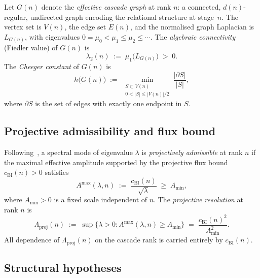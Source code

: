 \documentclass[12pt, a4paper]{article}
\theoremstyle{plain}
\theoremstyle{definition}
\theoremstyle{remark}
\begin{document}
      Let $G(n)$ denote the \emph{effective cascade graph} at rank $n$: a
      connected, $d(n)$-regular, undirected graph encoding the relational structure
      at stage~$n$.
      The vertex set is $V(n)$, the edge set $E(n)$, and the normalised graph
      Laplacian is $L_{G(n)}$, with eigenvalues
      $0 = \mu_0 < \mu_1 \leq \mu_2 \leq \cdots$.
      The \emph{algebraic connectivity} (Fiedler value) of $G(n)$ is
      \begin{equation}
        \label{eq:fiedler}
        \lambda_2(n) \;:=\; \mu_1\bigl(L_{G(n)}\bigr) \;>\; 0.
      \end{equation}
      The \emph{Cheeger constant} of $G(n)$ is
      \begin{equation}
        \label{eq:cheeger-def}
        h\bigl(G(n)\bigr)
        \;:=\;
        \min_{\substack{S \subset V(n) \\ 0 < |S| \leq |V(n)|/2}}
        \frac{|\partial S|}{|S|},
      \end{equation}
      where $\partial S$ is the set of edges with exactly one endpoint in $S$.

    \subsection{Projective admissibility and flux bound}
      \label{sec:framework:admissibility}

      Following~\cite{Beau2026a1, Beau2026a4}, a spectral mode
      of eigenvalue $\lambda$ is \emph{projectively admissible} at rank $n$ if the
      maximal effective amplitude supported by the projective flux bound
      $c_{\mathrm{BI}}(n) > 0$ satisfies
      \begin{equation}
        \label{eq:admissibility-envelope}
        A^{\max}(\lambda, n)
        \;:=\; \frac{c_{\mathrm{BI}}(n)}{\sqrt{\lambda}}
        \;\geq\; A_{\min},
      \end{equation}
      where $A_{\min} > 0$ is a fixed scale independent of $n$.
      The \emph{projective resolution} at rank $n$ is
      \begin{equation}
        \label{eq:Lambdaproj-def}
        \Lambda_{\mathrm{proj}}(n)
        \;:=\;
        \sup\bigl\{\lambda > 0 : A^{\max}(\lambda,n) \geq A_{\min}\bigr\}
        \;=\; \frac{c_{\mathrm{BI}}(n)^2}{A_{\min}^2}.
      \end{equation}
      All dependence of $\Lambda_{\mathrm{proj}}(n)$ on the cascade rank is
      carried entirely by $c_{\mathrm{BI}}(n)$.

    \subsection{Structural hypotheses}
      \label{sec:framework:hypotheses}
\end{document}
